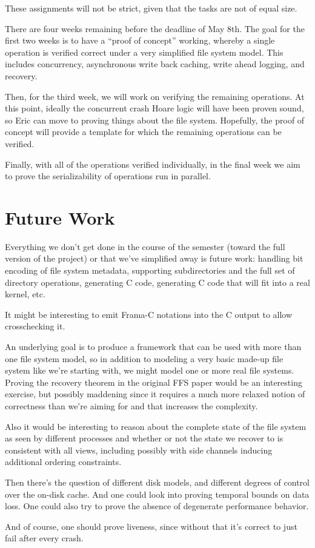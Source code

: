\documentclass[11pt, twocolumn, letterpaper]{article}
\begin{document}
These assignments will not be strict, given that the tasks are not
of equal size.

There are four weeks remaining before the deadline of May 8th. The goal for the
first two weeks is to have a ``proof of concept'' working, whereby a single
operation is verified correct under a very simplified file system model. This
includes concurrency, asynchronous write back caching, write ahead logging, and
recovery.

Then, for the third week, we will work on verifying the remaining operations.
At this point, ideally the concurrent crash Hoare logic will have been proven
sound, so Eric can move to proving things about the file system. Hopefully, the
proof of concept will provide a template for which the remaining operations can
be verified.

Finally, with all of the operations verified individually, in the final week we
aim to prove the serializability of operations run in parallel.

\section{Future Work}


Everything we don't get done in the course of the semester (toward the
full version of the project) or that we've simplified away is future
work: handling bit encoding of file system metadata, supporting
subdirectories and the full set of directory operations, generating C
code, generating C code that will fit into a real kernel, etc.

It might be interesting to emit Frama-C notations into the C output to
allow crosschecking it.

An underlying goal is to produce a framework that can be
used with more than one file system model, so in addition to modeling
a very basic made-up file system like we're starting with, we might
model one or more real file systems.
Proving the recovery theorem in the original FFS paper would be an
interesting exercise, but possibly maddening since it requires a much
more relaxed notion of correctness than we're aiming for and that
increases the complexity.

Also it would be interesting to reason about the complete state of the
file system as seen by different processes and whether or not the
state we recover to is consistent with all views, including possibly
with side channels inducing additional ordering
constraints.

Then there's the question of different disk models, and different
degrees of control over the on-disk cache.
And one could look into proving temporal bounds on data loss.
One could also try to prove the absence of degenerate performance
behavior.

And of course, one should prove liveness, since without that it's
correct to just fail after every crash.

%
%
\end{document}
